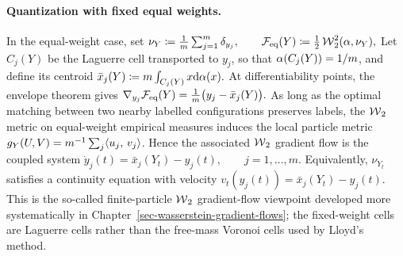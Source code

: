 \paragraph{Quantization with fixed equal weights.}
In the equal-weight case, set
\(\nu_Y\coloneqq \frac1m\sum_{j=1}^m\delta_{y_j}, \qquad \mathcal{F}_{\rm eq}(Y) \coloneqq \frac12\operatorname{\mathcal{W}}_2^2(\alpha,\nu_Y),\)
Let \(C_j(Y)\) be the Laguerre cell transported to \(y_j\), so that \(\alpha(C_j(Y))=1/m\), and define its centroid
\(\bar x_j(Y) \coloneqq m\int_{C_j(Y)} x\mathrm{d}\alpha(x).\)
At differentiability points, the envelope theorem gives \(\nabla_{y_j}\mathcal{F}_{\rm eq}(Y) = \frac1m\bigl(y_j-\bar x_j(Y)\bigr).\)
As long as the optimal matching between two nearby labelled configurations preserves labels, the \(\operatorname{\mathcal{W}}_2\) metric on equal-weight empirical measures induces the local particle metric \(g_Y(U,V)=m^{-1}\sum_j\langle u_j,\,v_j\rangle\). Hence the associated \(\operatorname{\mathcal{W}}_2\) gradient flow is the coupled system
\(\dot y_j(t) = \bar x_j(Y_t)-y_j(t), \qquad j=1,\ldots,m.\)
Equivalently, \(\nu_{Y_t}\) satisfies a continuity equation with velocity \(v_t(y_j(t))=\bar x_j(Y_t)-y_j(t)\). This is the so-called finite-particle \(\operatorname{\mathcal{W}}_2\) gradient-flow viewpoint developed more systematically in Chapter~\ref{sec-wasserstein-gradient-flows}; the fixed-weight cells are Laguerre cells rather than the free-mass Voronoi cells used by Lloyd's method.

